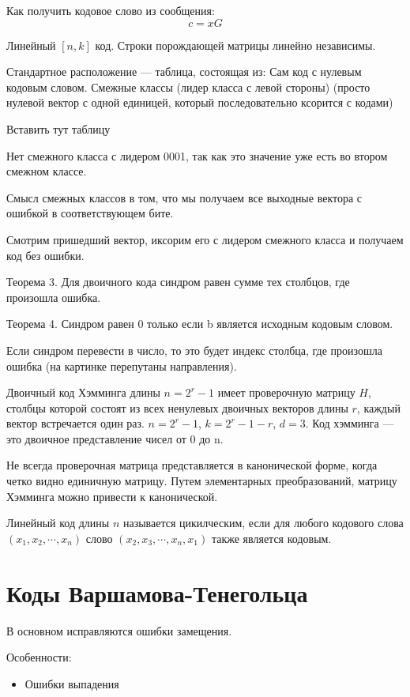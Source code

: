 {Как получить кодовое слово из сообщения:
\[
    c = xG
\]

Линейный $[n, k]$ код. Строки порождающей матрицы линейно независимы.



Стандартное расположение --- таблица, состоящая из:
Сам код с нулевым кодовым словом.
Смежные классы (лидер класса с левой стороны) (просто нулевой вектор с одной
единицей, который последовательно ксорится с кодами)

Вставить тут таблицу

Нет смежного класса с лидером 0001, так как это значение уже есть во втором
смежном классе.

Смысл смежных классов в том, что мы получаем все выходные вектора с ошибкой в
соответствующем бите.

Смотрим пришедший вектор, иксорим его с лидером смежного класса и получаем код
без ошибки.

Теорема 3. Для двоичного кода синдром равен сумме тех столбцов, где произошла
ошибка.

Теорема 4. Синдром равен 0 только если b является исходным кодовым словом.

Если синдром перевести в число, то это будет индекс столбца, где произошла
ошибка (на картинке перепутаны направления).

Двоичный код Хэмминга длины $n = 2^r - 1$ имеет проверочную матрицу $H$,
столбцы которой состоят из всех ненулевых двоичных векторов длины $r$, каждый
вектор встречается один раз. $n = 2^r - 1$, $k = 2^r - 1 - r$, $d = 3$. Код
хэмминга --- это двоичное представление чисел от 0 до n.

Не всегда проверочная матрица представляется в канонической форме, когда четко
видно единичную матрицу. Путем элементарных преобразований, матрицу Хэмминга
можно привести к канонической.

Линейный код длины $n$ называется цикилческим, если для любого кодового слова
$(x_1, x_2, \cdots, x_n)$ слово $(x_2, x_3, \cdots, x_n, x_1)$ также является
кодовым.

\section{Коды Варшамова-Тенегольца}

В основном исправляются ошибки замещения.

Особенности:
\begin{itemize}
    \item Ошибки выпадения


\end{itemize}}
